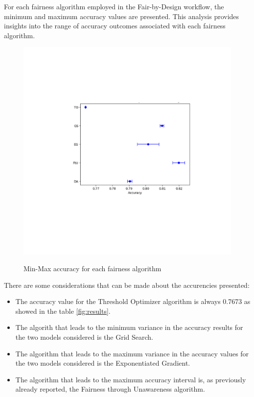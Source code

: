 For each fairness algorithm employed in the Fair-by-Design workflow, the minimum and maximum accuracy values are presented. This analysis provides insights into the range of accuracy outcomes associated with each fairness algorithm.

\begin{figure}[H]
    \centering
    \includegraphics[width=1.0\textwidth, height=1.0\textwidth]{accuracy.png}
    \label{fig:acc_alg}
    \caption{Min-Max accuracy for each fairness algorithm}
\end{figure}

There are some considerations that can be made about the accurencies presented:
\begin{itemize}
    \item The accuracy value for the Threshold Optimizer algorithm is always 0.7673 as showed in the table \cref{fig:results}.
    \item The algorith that leads to the minimum variance in the accuracy results for the two models considered is the Grid Search.
    \item The algorithm that leads to the maximum variance in the accuracy values for the two models considered is the Exponentiated Gradient.
    \item The algorithm that leads to the maximum accuracy interval is, as previously already reported, the Fairness through Unawareness algorithm.
\end{itemize}

